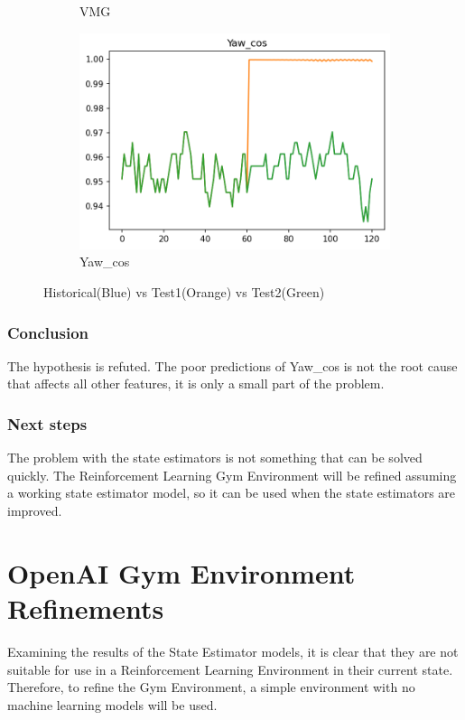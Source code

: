 \documentclass[12pt,twoside]{report}
\begin{document}
\begin{figure}[h]
\begin{subfigure}[b]{0.32\textwidth}
         \caption{VMG}
     \end{subfigure}
     \begin{subfigure}[b]{0.32\textwidth}
         \centering
         \includegraphics[width=\textwidth]{figures/prediction-plots-compared/Yaw_cos.png}
         \caption{Yaw\_cos}
     \end{subfigure}
        \caption{Historical(Blue) vs Test1(Orange) vs Test2(Green)}
        \label{fig:prediction-Yaw-cos}
\end{figure}

\subsubsection{Conclusion}
The hypothesis is refuted. The poor predictions of Yaw\_cos is not the root cause that affects all other features, it is only a small part of the problem.

\subsubsection{Next steps}
The problem with the state estimators is not something that can be solved quickly. The Reinforcement Learning Gym Environment will be refined assuming a working state estimator model, so it can be used when the state estimators are improved.

\section{OpenAI Gym Environment Refinements}
Examining the results of the State Estimator models, it is clear that they are not suitable for use in a Reinforcement Learning Environment in their current state. Therefore, to refine the Gym Environment, a simple environment with no machine learning models will be used.
\end{document}
